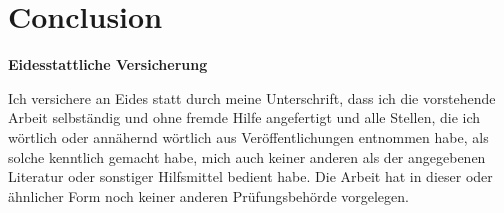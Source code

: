 \documentclass[11pt,a4paper]{article}
\begin{document}
\hypertarget{conclusion}{%
\section{Conclusion}\label{conclusion}}

\newpage
\renewcommand*{\mkbibnamefamily}[1]{\textbf{#1}}
\renewcommand*{\mkbibnamegiven}[1]{\textbf{#1}}
\renewcommand*{\mkbibnameprefix}[1]{\textbf{#1}}
\renewcommand*{\mkbibnamesuffix}[1]{\textbf{#1}}
\printbibliography[title=References]

\newpage
\textbf{Eidesstattliche Versicherung}

\bigskip

Ich versichere an Eides statt durch meine Unterschrift, dass ich die vorstehende Arbeit selbständig und ohne fremde Hilfe angefertigt und alle Stellen, die ich wörtlich oder annähernd wörtlich aus Veröffentlichungen entnommen habe, als solche kenntlich gemacht habe, mich auch keiner anderen als der angegebenen Literatur oder sonstiger Hilfsmittel bedient habe. Die Arbeit hat in dieser oder ähnlicher Form noch keiner anderen Prüfungsbehörde vorgelegen.

\vspace{1cm}
\rule{0pt}{2\baselineskip} %
\par\noindent{} \hfill\makebox[2.25in]{\hrulefill}%
\par\noindent\makebox[2.25in][l]{} \hfill{}%
\end{document}
